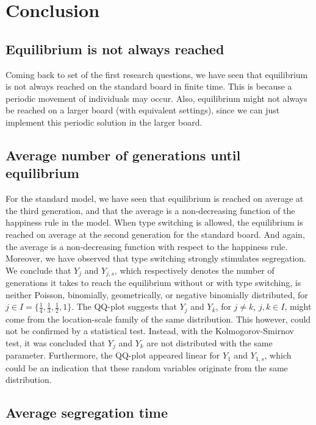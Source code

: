 \section{Conclusion}
\subsection{Equilibrium is not always reached}
Coming back to set of the first research questions, we have seen that equilibrium is not always reached on the standard board in finite time. This is because a periodic movement of individuals may occur. Also, equilibrium might not always be reached on a larger board (with equivalent settings), since we can just implement this periodic solution in the larger board.\\

\subsection{Average number of generations until equilibrium}
For the standard model, we have seen that equilibrium is reached on average at the third generation, and that the average is a non-decreasing function of the happiness rule in the model. When type switching is allowed, the equilibrium is reached on average at the second generation for the standard board. And again, the average is a non-decreasing function with respect to the happiness rule. Moreover, we have observed that type switching strongly stimulates segregation.\\

We conclude that $Y_j$ and $Y_{j,s}$, which respectively denotes the number of generations it takes to reach the equilibrium without or with type switching, is neither Poisson, binomially, geometrically, or negative binomially distributed, for $j\in I=\{\frac{1}{4}, \frac{1}{3}, \frac{1}{2} ,1\}$. The QQ-plot suggests that $Y_j$ and $Y_k$, for $j\neq k$, $j,k\in I$, might come from the location-scale family of the same distribution. This however, could not be confirmed by a statistical test. Instead, with the Kolmogorov-Smirnov test, it was concluded that $Y_j$ and $Y_k$ are not distributed with the same parameter. Furthermore, the QQ-plot appeared linear for $Y_1$ and $Y_{1,s}$, which could be an indication that these random variables originate from the same distribution. \\

\subsection{Average segregation time}

